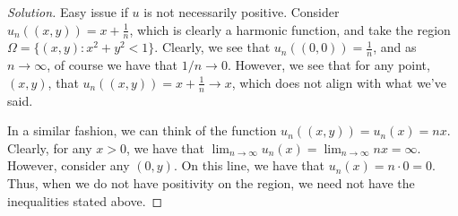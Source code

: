 \documentclass[10pt]{article}
\begin{document}
\begin{proof}[Solution]
Easy issue if $u$ is not necessarily positive. Consider $u_n((x,y)) = x + \frac{1}{n}$, which is clearly a harmonic function, and take the region $\Omega = \{ (x,y) : x^2 + y^2 < 1 \}$. Clearly, we see that $u_n((0,0)) = \frac{1}{n}$, and as $n \to \infty$, of course we have that $1/n \to 0$. However, we see that for any point, $(x,y)$, that $u_n((x,y)) = x + \frac{1}{n} \to x$, which does not align with what we've said.   

In a similar fashion, we can think of the function $u_n((x,y)) = u_n(x)  = nx$. Clearly, for any $ x > 0$, we have that $\lim_{n \to \infty} u_n(x) = \lim_{n \to \infty} nx = \infty$. However, consider any $(0,y)$. On this line, we have that $u_n(x) = n \cdot 0 = 0$. Thus, when we do not have positivity on the region, we need not have the inequalities stated above.  
\end{proof}
\end{document}
